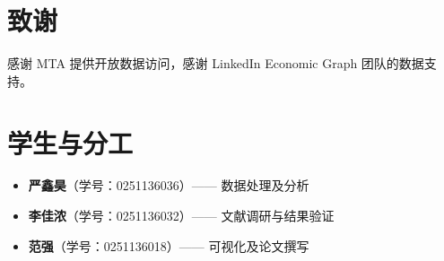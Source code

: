 \documentclass[runningheads]{llncs}
\begin{document}
\section*{致谢}
感谢 MTA 提供开放数据访问，感谢 LinkedIn Economic Graph 团队的数据支持。

\section*{学生与分工}

\begin{itemize}
  \item \textbf{严鑫昊}（学号：0251136036）—— 数据处理及分析
  \item \textbf{李佳浓}（学号：0251136032）—— 文献调研与结果验证
  \item \textbf{范强}（学号：0251136018）—— 可视化及论文撰写
\end{itemize}



\end{document}
